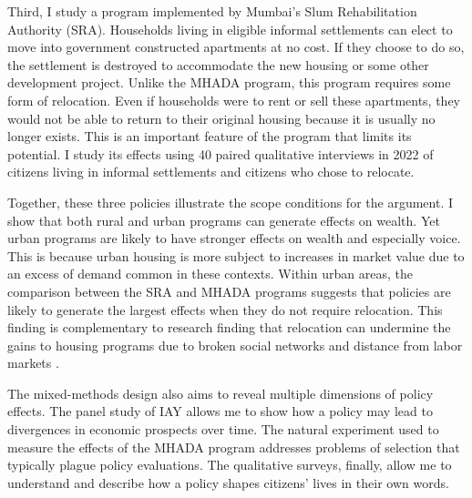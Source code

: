 \documentclass[12pt]{article}
\begin{document}
Third, I study a program implemented by Mumbai's Slum Rehabilitation Authority (SRA).  Households living in eligible informal settlements can elect to move into government constructed apartments at no cost. If they choose to do so, the settlement is destroyed to accommodate the new housing or some other development project. Unlike the MHADA program, this program requires some form of relocation. Even if households were to rent or sell these apartments, they would not be able to return to their original housing because it is usually no longer exists. This is an important feature of the program that limits its potential. I study its effects using 40 paired qualitative interviews in 2022 of citizens living in informal settlements and citizens who chose to relocate. 


Together, these three policies illustrate the scope conditions for the argument. I show that both rural and urban programs can generate effects on wealth. Yet urban programs are likely to have stronger effects on wealth and especially voice. This is because urban housing is more subject to increases in market value due to an excess of demand common in these contexts. Within urban areas, the comparison between the SRA and MHADA programs suggests that policies are likely to generate the largest effects when they do not require relocation. This finding is complementary to research finding that relocation can undermine the gains to housing programs due to broken social networks and distance from labor markets \citep{barnhardt_moving_2017, picarelli_there_2019}.


The mixed-methods design also aims to reveal multiple dimensions of policy effects. The panel study of IAY allows me to show how a policy may lead to divergences in economic prospects over time. The natural experiment used to measure the effects of the MHADA program addresses problems of selection that typically plague policy evaluations.  The qualitative surveys, finally, allow me to understand and describe how a policy shapes citizens' lives in their own words. 





\end{document}
